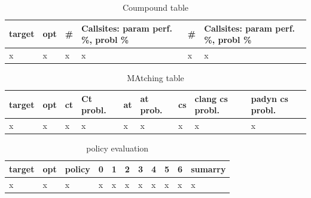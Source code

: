 \begin{table}[H]
\centering
\caption{Coumpound table}
\label{Integer overflow bug detection in CWE-190}
\begin{tabular}{|l|l|l|l|l|l|} \hline
\textbf{target}  & \textbf{opt}     & \textbf{\#}    &\textbf{Callsites: param perf. \%, probl \%} & \textbf{\#}  & \textbf{Callsites: param perf. \%, probl \%}  \\ \hline 
x                &x                 &x               &x                                      &x             &x                                        \\ \hline

\end{tabular}
\end{table}


\begin{table}[H]
\centering
\caption{MAtching table}
\label{Integer overflow bug detection in CWE-190}
\begin{tabular}{|l|l|l|l|l|l|l|l|l|} \hline
\textbf{target}  & \textbf{opt}     & \textbf{ct}    &\textbf{Ct probl.} & \textbf{at}  & \textbf{at prob.} &\textbf{cs} & \textbf{clang cs probl.}  & \textbf{padyn cs probl.}  \\ \hline 
x                &x                 &x               &x                  &x             &x                  &x           &x                          &x   \\ \hline

\end{tabular}
\end{table}


\begin{table}[H]
\centering
\caption{policy evaluation}
\label{Integer overflow bug detection in CWE-190}
\begin{tabular}{|l|l|l|l|l|l|l|l|l|l|l|} \hline
\textbf{target}  & \textbf{opt}     & \textbf{policy}    &\textbf{0} & \textbf{1}  & \textbf{2} &\textbf{3} & \textbf{4}  & \textbf{5} & \textbf{6}  & \textbf{sumarry}  \\ \hline 
x                &x                 &x                   &x          &x            &x           &x          &x            &x           &x            &x \\ \hline

\end{tabular}
\end{table}


